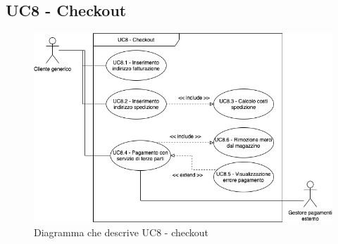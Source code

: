\subsection{UC8 - Checkout}
\label{UC8}
\begin{figure}[H]
    \centering
    \includegraphics[width=\linewidth]{res/images/UC/UC8.png}
    \caption{Diagramma che descrive UC8 - checkout} 
\end{figure}
